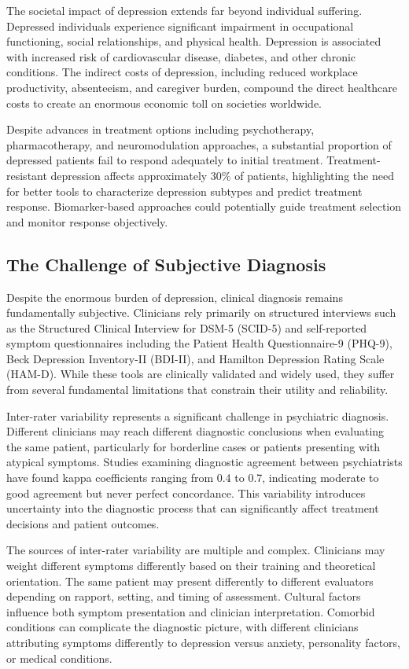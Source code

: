 \documentclass[blue,fullpaper]{ludusofficial}  %
\begin{document}
The societal impact of depression extends far beyond individual suffering. Depressed individuals experience significant impairment in occupational functioning, social relationships, and physical health. Depression is associated with increased risk of cardiovascular disease, diabetes, and other chronic conditions. The indirect costs of depression, including reduced workplace productivity, absenteeism, and caregiver burden, compound the direct healthcare costs to create an enormous economic toll on societies worldwide.

Despite advances in treatment options including psychotherapy, pharmacotherapy, and neuromodulation approaches, a substantial proportion of depressed patients fail to respond adequately to initial treatment. Treatment-resistant depression affects approximately 30\% of patients, highlighting the need for better tools to characterize depression subtypes and predict treatment response. Biomarker-based approaches could potentially guide treatment selection and monitor response objectively.

\subsection{The Challenge of Subjective Diagnosis}

Despite the enormous burden of depression, clinical diagnosis remains fundamentally subjective. Clinicians rely primarily on structured interviews such as the Structured Clinical Interview for DSM-5 (SCID-5) and self-reported symptom questionnaires including the Patient Health Questionnaire-9 (PHQ-9), Beck Depression Inventory-II (BDI-II), and Hamilton Depression Rating Scale (HAM-D). While these tools are clinically validated and widely used, they suffer from several fundamental limitations that constrain their utility and reliability.

Inter-rater variability represents a significant challenge in psychiatric diagnosis. Different clinicians may reach different diagnostic conclusions when evaluating the same patient, particularly for borderline cases or patients presenting with atypical symptoms. Studies examining diagnostic agreement between psychiatrists have found kappa coefficients ranging from 0.4 to 0.7, indicating moderate to good agreement but never perfect concordance. This variability introduces uncertainty into the diagnostic process that can significantly affect treatment decisions and patient outcomes.

The sources of inter-rater variability are multiple and complex. Clinicians may weight different symptoms differently based on their training and theoretical orientation. The same patient may present differently to different evaluators depending on rapport, setting, and timing of assessment. Cultural factors influence both symptom presentation and clinician interpretation. Comorbid conditions can complicate the diagnostic picture, with different clinicians attributing symptoms differently to depression versus anxiety, personality factors, or medical conditions.
\end{document}
